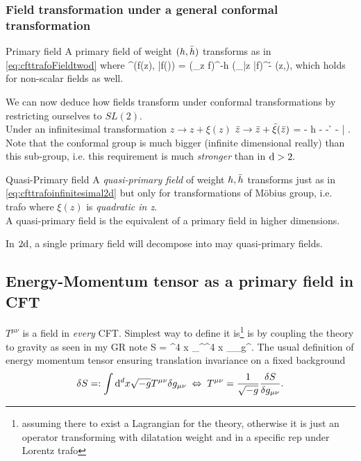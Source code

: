 \subsubsection{Field transformation under a general conformal transformation}
\begin{mybox}{Primary field}
	A primary field of weight $(h,\bar{h})$ transforms as in \ref{eq:cfttrafoFieldtwod} where
	\be 
	\label{eq:cftPrimaryfield2d}
	\phi^\prime (f(z), \bar{f}(\z)) = (\partial_z f)^{-h} (\partial_{\bar{z}} \bar{f})^{-\h} \phi(z,\z),
	\ee
	which holds for non-scalar fields as well.
\end{mybox}
We can now deduce how fields transform under conformal transformations by restricting ourselves to $SL(2)$.\\
Under an infinitesimal transformation $z\rightarrow z+\xi(z)$ $\bar{z} \rightarrow \bar{z} + \bar{\xi}(\bar{z})$ 
\be 
\label{eq:cfttrafoinfinitesimal2d}
\delta \phi = - h  \phi - \xi {} - \h \frac{\partial \bar{\xi}}{\partial \z} \phi - \bar{\xi} \frac{\partial \phi}{\partial \z}.
\ee 
Note that the conformal group is much bigger (infinite dimensional really) than this sub-group, i.e. this requirement is much \emph{stronger} than in $\mathrm{d}>2.$
\begin{mybox}{Quasi-Primary field}
A \emph{quasi-primary field} of weight $h,\bar{h}$ transforms just as in \ref{eq:cfttrafoinfinitesimal2d} but only for transformations of Möbius group, i.e. trafo where $\xi(z)$ is \emph{quadratic in z}.\\
A quasi-primary field is the equivalent of a primary field in higher dimensions.
\end{mybox}
In $2\mathrm{d}$, a single primary field will decompose into may quasi-primary fields.











\subsection{Energy-Momentum tensor as a primary field in CFT}

$T^{\mu \nu}$ is a field in \emph{every} CFT. Simplest way to define it is\footnote{assuming there to exist a Lagrangian for the theory, otherwise it is just an operator transforming with dilatation weight and in a specific rep under Lorentz trafo} is by coupling the theory to gravity as seen in my GR note 
\bse 
S = \int \md^4 x \partial_\mu \phi \partial^\mu \phi \longrightarrow \int \md^4 x  \nabla_\mu \phi \nabla_\nu \phi g^{\mu \nu}.
\ese 
The usual definition of energy momentum tensor ensuring translation invariance on a fixed background
\begin{equation}
\delta S =: \int \mathrm{d}^d x \sqrt{-g} T^{\mu \nu} \delta g_{\mu \nu} \; \Leftrightarrow \; T^{\mu \nu} = \frac{1}{\sqrt{-g}} \frac{\delta S}{\delta g_{\mu \nu} }.
\end{equation}

